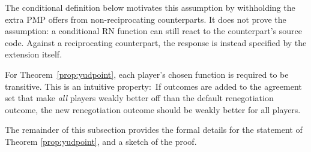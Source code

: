 \documentclass[sigconf]{aamas}
\theoremstyle{definition}
\begin{document}
The conditional definition below motivates this assumption by withholding
the extra PMP offers from non-reciprocating counterparts. It does not
prove the assumption: a conditional RN function can still react to the
counterpart's source code. Against a reciprocating counterpart, the
response is instead specified by the extension itself.

For Theorem~\ref{prop:yudpoint}, each player's chosen
\selfunction{} function is required to be transitive.
This is an intuitive property:\ If outcomes are added to the agreement
set that make \textit{all} players weakly better off
than the default renegotiation outcome,
the new renegotiation outcome should be weakly better for all players.

\par The remainder of this subsection provides the formal 
details for the statement of Theorem \ref{prop:yudpoint}, 
and a sketch of the proof.
\end{document}
